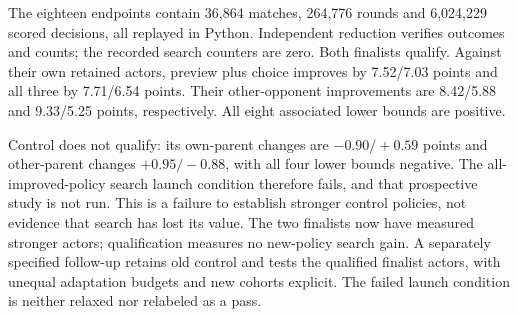 The eighteen endpoints contain 36,864 matches, 264,776 rounds and 6,024,229
scored decisions, all replayed in Python. Independent reduction verifies
outcomes and counts; the recorded search counters are zero. Both finalists
qualify. Against their own retained actors, preview plus choice improves by
7.52/7.03 points and all three by 7.71/6.54 points. Their other-opponent
improvements are 8.42/5.88 and 9.33/5.25 points, respectively. All eight
associated lower bounds are positive.

Control does not qualify: its own-parent changes are $-0.90/+0.59$ points
and other-parent changes $+0.95/-0.88$, with all four lower bounds negative.
The all-improved-policy search launch condition therefore fails, and that
prospective study is not run. This is a failure to establish stronger control
policies, not evidence that search has lost its value. The two finalists now
have measured stronger actors; qualification measures no new-policy search
gain. A separately specified follow-up retains old control and tests the
qualified finalist actors, with unequal adaptation budgets and new cohorts
explicit.
The failed launch condition is neither relaxed nor relabeled as a pass.
\begin{table}[ht]
\centering\small

\caption{All twelve paired qualification contrasts, in percentage points,
with one-sided lower bounds at quantile $0.05/12$. The nominal 95\%
familywise target is within this study only. A longer training duration
does not itself qualify an improved policy.}
\label{tab:public-stock-adaptation-contrasts}
\end{table}
\FloatBarrier
